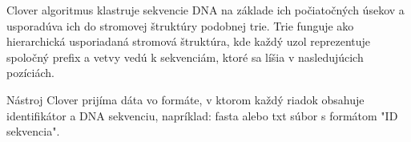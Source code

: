 Clover algoritmus klastruje sekvencie DNA na základe ich počiatočných úsekov a usporadúva ich do stromovej štruktúry podobnej trie.
Trie funguje ako hierarchická usporiadaná stromová štruktúra, kde každý uzol reprezentuje spoločný prefix a vetvy vedú k sekvenciám, ktoré sa líšia v nasledujúcich pozíciách.

Nástroj Clover prijíma dáta vo formáte, v ktorom každý riadok obsahuje identifikátor a DNA sekvenciu, napríklad: fasta alebo txt súbor s formátom "ID sekvencia".
